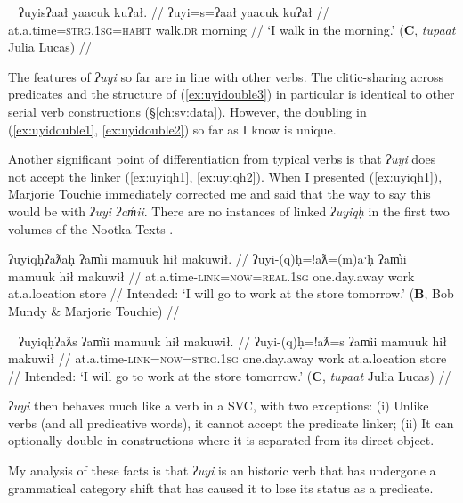 \ex~ \label{ex:uyidouble3}
\begingl
\glpreamble ʔuyisʔaał yaacuk kuʔał. //
\gla ʔuyi=s=ʔaał yaacuk kuʔał //
\glb at.a.time=\textsc{strg.1sg}=\textsc{habit} walk.\textsc{dr} morning //
\glft `I walk in the morning.' (\textbf{C}, \textit{tupaat} Julia Lucas) //
\endgl
\xe

The features of \textit{ʔuyi} so far are in line with other verbs. The clitic-sharing across predicates and the structure of (\ref{ex:uyidouble3}) in particular is identical to other serial verb constructions (\S\ref{ch:sv:data}). However, the doubling in (\ref{ex:uyidouble1}, \ref{ex:uyidouble2}) so far as I know is unique.

Another significant point of differentiation from typical verbs is that \textit{ʔuyi} does not accept the linker (\ref{ex:uyiqh1}, \ref{ex:uyiqh2}). When I presented (\ref{ex:uyiqh1}), Marjorie Touchie immediately corrected me and said that the way to say this would be with \textit{ʔuyi ʔam̓ii}. There are no instances of linked \textit{ʔuyiqḥ} in the first two volumes of the Nootka Texts \citep{sapir1939, sapir1955}.

\ex \label{ex:uyiqh1}
\begingl
\glpreamble *ʔuyiqḥʔaƛaḥ ʔam̓ii mamuuk hił makuwił. //
\gla ʔuyi-(q)ḥ=!aƛ=(m)aˑḥ ʔam̓ii mamuuk hił makuwił //
\glb at.a.time-\textsc{link}=\textsc{now}=\textsc{real.1sg} one.day.away work at.a.location store //
\glft Intended: `I will go to work at the store tomorrow.' (\textbf{B}, Bob Mundy \& Marjorie Touchie) //
\endgl
\xe

\ex~ \label{ex:uyiqh2}
\begingl
\glpreamble *ʔuyiqḥʔaƛs ʔam̓ii mamuuk hił makuwił. //
\gla ʔuyi-(q)ḥ=!aƛ=s ʔam̓ii mamuuk hił makuwił //
\glb at.a.time-\textsc{link}=\textsc{now}=\textsc{strg.1sg} one.day.away work at.a.location store //
\glft Intended: `I will go to work at the store tomorrow.' (\textbf{C}, \textit{tupaat} Julia Lucas) //
\endgl
\xe

\textit{ʔuyi} then behaves much like a verb in a SVC, with two exceptions: (i) Unlike verbs (and all predicative words), it cannot accept the predicate linker; (ii) It can optionally double in constructions where it is separated from its direct object.

My analysis of these facts is that \textit{ʔuyi} is an historic verb that has undergone a grammatical category shift that has caused it to lose its status as a predicate.

